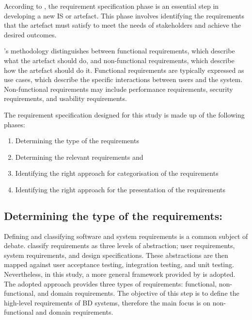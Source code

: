 \documentclass[journal]{IEEEtran}
\begin{document}
According to \cite{wieringa2014design}\cite{wieringa2014design}, the requirement specification phase is an essential step in developing a new IS or artefact. This phase involves identifying the requirements that the artefact must satisfy to meet the needs of stakeholders and achieve the desired outcomes.

\cite{wieringa2014design}'s methodology distinguishes between functional requirements, which describe what the artefact should do, and non-functional requirements, which describe how the artefact should do it. Functional requirements are typically expressed as use cases, which describe the specific interactions between users and the system. Non-functional requirements may include performance requirements, security requirements, and usability requirements.

The requirement specification designed for this study is made up of the following phases: 

\begin{enumerate}
    \item Determining the type of the requirements 
    \item Determining the relevant requirements and 
    \item Identifying the right approach for categorisation of the requirements 
    \item Identifying the right approach for the presentation of the requirements 
\end{enumerate}

\subsection{Determining the type of the requirements:}

Defining and classifying software and system requirements is a common subject of debate. \cite{sommerville2011software}\cite{sommerville2011software} classify requirements as three levels of abstraction; user requirements, system requirements, and design specifications. These abstractions are then mapped against user acceptance testing, integration testing, and unit testing. Nevertheless, in this study, a more general framework provided by \cite{laplante2017requirements} is adopted. The adopted approach provides three types of requirements: functional, non-functional, and domain requirements. The objective of this step is to define the high-level requirements of BD systems, therefore the main focus is on non-functional and domain requirements. 
\end{document}

